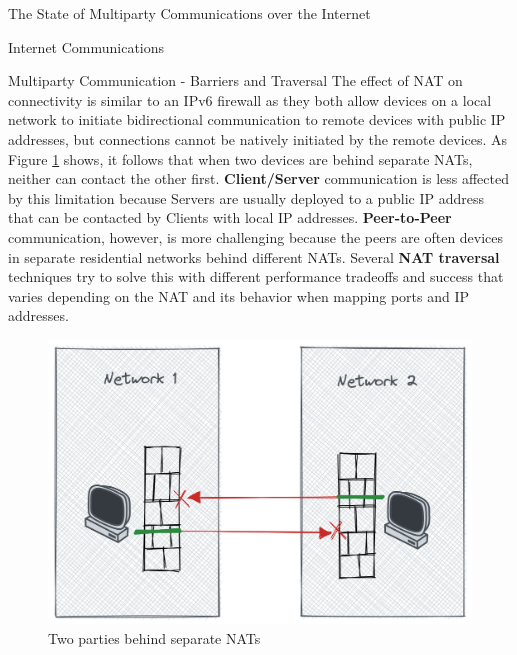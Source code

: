 \begin{frame}[fragile]{The State of Multiparty Communications over the
Internet}
\begin{block}{Internet Communications}
\begin{block}{Multiparty Communication - Barriers and Traversal}
The effect of NAT on connectivity is similar to an IPv6 firewall as they
both allow devices on a local network to initiate bidirectional
communication to remote devices with public IP addresses, but
connections cannot be natively initiated by the remote devices. As
Figure \ref{nat-intro} shows, it follows that when two devices are
behind separate NATs, neither can contact the other first.
\textbf{Client/Server} communication is less affected by this limitation
because Servers are usually deployed to a public IP address that can be
contacted by Clients with local IP addresses. \textbf{Peer-to-Peer}
communication, however, is more challenging because the peers are often
devices in separate residential networks behind different NATs. Several
\textbf{NAT traversal} techniques try to solve this with different
performance tradeoffs and success that varies depending on the NAT
\autocite{natBehaviorRFC} and its behavior when mapping ports and IP
addresses.

\begin{figure}
\centering
\includegraphics[width=\textwidth,height=0.25\textheight]{thesis/../figures/nat-intro.png}
\caption{Two parties behind separate NATs\label{nat-intro}}
\end{figure}


\end{block}
\end{block}
\end{frame}
